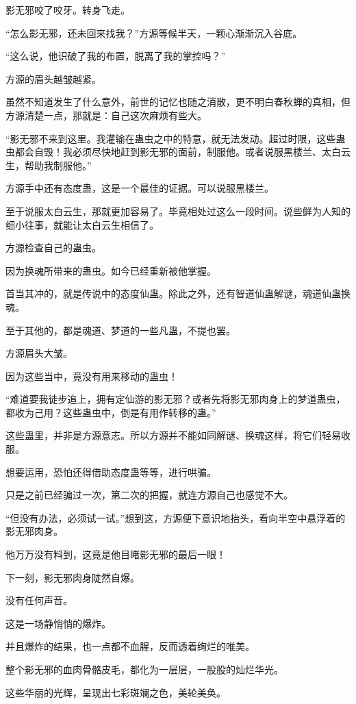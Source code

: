 \begin{this_body}
影无邪咬了咬牙。转身飞走。

“怎么影无邪，还未回来找我？”方源等候半天，一颗心渐渐沉入谷底。

“这么说，他识破了我的布置，脱离了我的掌控吗？”

方源的眉头越皱越紧。

虽然不知道发生了什么意外，前世的记忆也随之消散，更不明白春秋蝉的真相，但方源清楚一点，那就是：自己这次麻烦有些大。

“影无邪不来到这里。我灌输在蛊虫之中的特意，就无法发动。超过时限，这些蛊虫都会自毁！我必须尽快地赶到影无邪的面前，制服他。或者说服黑楼兰、太白云生，帮助我制服他。”

方源手中还有态度蛊，这是一个最佳的证据。可以说服黑楼兰。

至于说服太白云生，那就更加容易了。毕竟相处过这么一段时间。说些鲜为人知的细小往事，就能让太白云生相信了。

方源检查自己的蛊虫。

因为换魂所带来的蛊虫。如今已经重新被他掌握。

首当其冲的，就是传说中的态度仙蛊。除此之外，还有智道仙蛊解谜，魂道仙蛊换魂。

至于其他的，都是魂道、梦道的一些凡蛊，不提也罢。

方源眉头大皱。

因为这些当中，竟没有用来移动的蛊虫！

“难道要我徒步追上，拥有定仙游的影无邪？或者先将影无邪肉身上的梦道蛊虫，都收为己用？这些蛊虫中，倒是有用作转移的蛊。”

这些蛊里，并非是方源意志。所以方源并不能如同解谜、换魂这样，将它们轻易收服。

想要运用，恐怕还得借助态度蛊等等，进行哄骗。

只是之前已经骗过一次，第二次的把握，就连方源自己也感觉不大。

“但没有办法，必须试一试。”想到这，方源便下意识地抬头，看向半空中悬浮着的影无邪肉身。

他万万没有料到，这竟是他目睹影无邪的最后一眼！

下一刻，影无邪肉身陡然自爆。

没有任何声音。

这是一场静悄悄的爆炸。

并且爆炸的结果，也一点都不血腥，反而透着绚烂的唯美。

整个影无邪的血肉骨骼皮毛，都化为一层层，一股股的灿烂华光。

这些华丽的光辉，呈现出七彩斑斓之色，美轮美奂。


\end{this_body}
